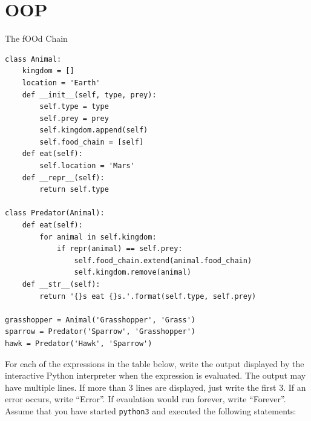 \documentclass{exam}
\begin{document}
\section{OOP}
\begin{questions}
\item The fOOd Chain
\begin{lstlisting}
class Animal:
    kingdom = []
    location = 'Earth'
    def __init__(self, type, prey):
        self.type = type
        self.prey = prey
        self.kingdom.append(self)
        self.food_chain = [self]
    def eat(self):
        self.location = 'Mars'
    def __repr__(self):
        return self.type
    
class Predator(Animal):
    def eat(self):
        for animal in self.kingdom:
            if repr(animal) == self.prey:
                self.food_chain.extend(animal.food_chain)
                self.kingdom.remove(animal)
    def __str__(self):
        return '{}s eat {}s.'.format(self.type, self.prey)

grasshopper = Animal('Grasshopper', 'Grass')
sparrow = Predator('Sparrow', 'Grasshopper')
hawk = Predator('Hawk', 'Sparrow')
\end{lstlisting}
\clearpage
For each of the expressions in the table below, write the output displayed by the interactive Python interpreter when the expression is evaluated. The output may have multiple lines. If more than 3 lines are displayed, just write the first 3. If an error occurs, write “Error”. If evaulation would run forever, write “Forever”.\\
Assume that you have started \texttt{python3} and executed the following statements:


\end{questions}
\end{document}
